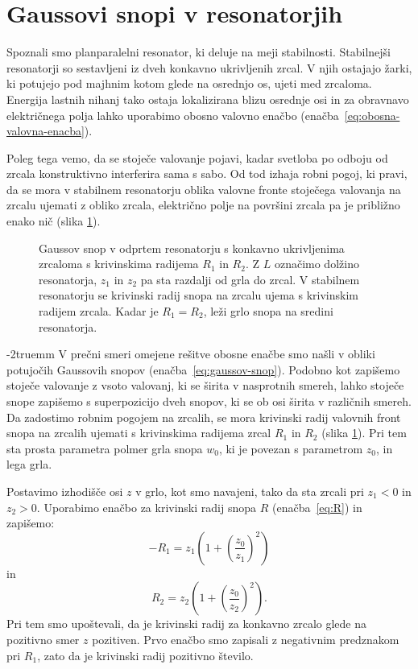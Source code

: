 \section{Gaussovi snopi v resonatorjih}
Spoznali smo planparalelni resonator, ki deluje na meji stabilnosti. 
Stabilnejši resonatorji so sestavljeni iz dveh konkavno ukrivljenih
zrcal. V njih ostajajo žarki, ki potujejo pod majhnim kotom glede na osrednjo os, ujeti
med zrcaloma. Energija lastnih nihanj tako ostaja lokalizirana blizu osrednje osi in za obravnavo
električnega polja lahko uporabimo obosno valovno 
enačbo (enačba~\ref{eq:obosna-valovna-enacba}). 

Poleg tega vemo, da se stoječe valovanje pojavi, kadar
svetloba po odboju od zrcala konstruktivno interferira sama s sabo.
Od tod izhaja robni pogoj, ki pravi, da se mora v stabilnem resonatorju 
oblika valovne fronte stoječega valovanja na 
zrcalu ujemati z obliko zrcala, električno polje na površini zrcala
pa je približno enako nič (slika \ref{fig:Gaussov-snop-v-resonatorju}).
\begin{figure}[ht]
\centering
\def\svgwidth{90truemm} 

\caption{Gaussov snop v odprtem resonatorju s konkavno ukrivljenima zrcaloma
s krivinskima radijema $R_1$ in $R_2$. Z $L$ označimo dolžino resonatorja,
$z_1$ in $z_2$ pa sta razdalji od grla do zrcal. V stabilnem resonatorju se krivinski 
radij snopa na zrcalu ujema s krivinskim radijem zrcala. Kadar je $R_1 = R_2$, 
leži grlo snopa na sredini resonatorja. }
\label{fig:Gaussov-snop-v-resonatorju}
\end{figure}
\vglue-2truemm
V prečni smeri omejene rešitve obosne enačbe smo našli v obliki potujočih
Gaussovih snopov (enačba~\ref{eq:gaussov-snop}). 
Podobno kot zapišemo stoječe valovanje z vsoto valovanj, ki se širita v nasprotnih smereh,
lahko stoječe snope zapišemo s superpozicijo dveh snopov, ki se ob osi širita v različnih smereh. 
Da zadostimo robnim pogojem na zrcalih, se mora krivinski radij valovnih front 
snopa na zrcalih ujemati s krivinskima radijema zrcal $R_{1}$ in $R_{2}$ 
(slika \ref{fig:Gaussov-snop-v-resonatorju}).
Pri tem sta prosta parametra polmer grla snopa $w_0$, 
ki je povezan s parametrom $z_{0}$, in lega grla. 

Postavimo izhodišče osi $z$ v grlo, kot smo
navajeni, tako da sta zrcali pri $z_{1}<0$ in $z_{2}>0$. Uporabimo enačbo
za krivinski radij snopa $R$ (enačba~\ref{eq:R}) in zapišemo:
\begin{equation}
-R_{1}  =  z_{1}\left(1+\left(\frac{z_{0}}{z_{1}}\right)^{2}\right)
\label{eq:krivinski1} 
\end{equation}
in
\begin{equation}
R_{2}  =  z_{2}\left(1+\left(\frac{z_{0}}{z_{2}}\right)^{2}\right)\!\!.
\label{eq:krivinski}
\end{equation}
Pri tem smo upoštevali, da je krivinski radij za konkavno zrcalo glede na 
pozitivno smer $z$ pozitiven. Prvo enačbo smo zapisali z negativnim 
predznakom pri $R_1$, zato da je krivinski radij pozitivno število.

